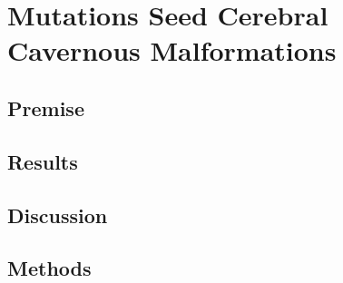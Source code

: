 \chapter{ Mutations Seed Cerebral Cavernous Malformations}

\section{Premise}
\section{Results}
\section{Discussion}
\section{Methods}